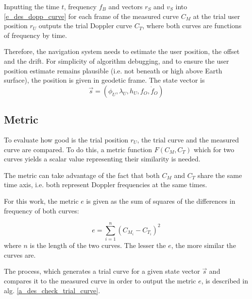 Inputting  the time $t$, frequency $f_B$ and vectors $r_S$ and $v_S$ into \autoref{e_des_dopp_curve} for each frame of the measured curve $C_M$ at the trial user position $r_U$ outputs the trial Doppler curve $C_T$, where both curves are functions of frequency by time.  %

Therefore, the navigation system needs to estimate the user position, the offset and the drift. For simplicity of algorithm debugging, and to ensure the user position estimate remains plausible (i.e. not beneath or high above Earth surface), the position is given in geodetic frame. The state vector is
\begin{equation*}
    \Vec{s} = (\phi_U, \lambda_U, h_U, f_O, \dot f_O)
\end{equation*}

\subsection{Metric} %
To evaluate how good is the trial position $r_U$, the trial curve and the measured curve are compared. To do this, a metric function $F(C_M, C_T)$ which for two curves yields a scalar value representing their similarity is needed.

The metric can take advantage of the fact that both $C_M$ and $C_T$ share the same time axis, i.e. both represent Doppler frequencies at the same times.

For this work, the metric $e$ is given as the sum of squares of the differences in frequency of both curves:

\begin{equation}
    e = \sum_{i=1}^n (C_{M_i} - C_{T_i})^2
\end{equation}
where $n$ is the length of the two curves. The lesser the $e$, the more similar the curves are.

The process, which generates a trial curve for a given state vector $\Vec{s}$ and compares it to the measured curve in order to output the metric $e$, is described in alg.
\ref{a_des_check_trial_curve}.

